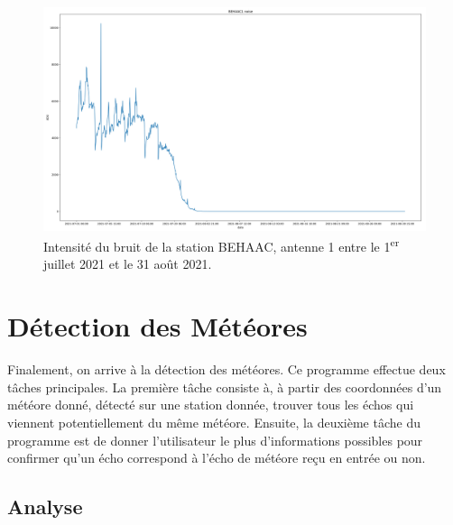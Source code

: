 \documentclass[11pt]{article}
\begin{document}
\begin{figure}[t]
    \begin{center}
        \includegraphics[scale=0.235]{BEHAAC1_2021-07-01_2021-08-31_noise.png}
        \caption{Intensité du bruit de la station BEHAAC, antenne 1 entre le 1\textsuperscript{er} juillet 2021 et le 31 août 2021.}
    \end{center}
\end{figure}

\newpage

\section{Détection des Météores}

Finalement, on arrive à la détection des météores.
Ce programme effectue deux tâches principales.
La première tâche consiste à, à partir des coordonnées d'un météore donné, détecté sur une station donnée, trouver tous les échos qui viennent potentiellement du même météore.
Ensuite, la deuxième tâche du programme est de donner l'utilisateur le plus d'informations possibles pour confirmer qu'un écho correspond à l'écho de météore reçu en entrée ou non.

\subsection{Analyse}
\end{document}
